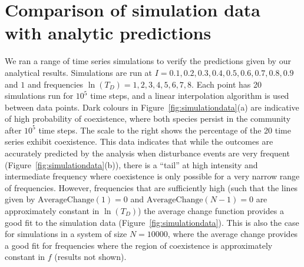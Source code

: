 \section{Comparison of simulation data with analytic predictions}
\label{app2d}
We ran a range of time series simulations to verify the predictions given by our analytical results. Simulations are run at $I=0.1,0.2,0.3,0.4,0.5,0.6,0.7,0.8,0.9$ and $1$ and frequencies $\ln(T_D)=1,2,3,4,5,6,7,8$. Each point has 20 simulations run for $10^5$ time steps, and a linear interpolation algorithm is used between data points. Dark colours in Figure~\ref{fig:simulationdata}(a) are indicative of high probability of coexistence, where both species persist in the community after $10^5$ time steps. The scale to the right shows the percentage of the 20 time series exhibit coexistence. This data indicates that while the outcomes are accurately predicted by the analysis when disturbance events are very frequent (Figure~\ref{fig:simulationdata}(b)), there is a ``tail'' at high intensity and intermediate frequency where coexistence is only possible for a very narrow range of frequencies. However, frequencies that are sufficiently high (such that the lines given by $\text{AverageChange}(1)=0$ and $\text{AverageChange}(N-1)=0$  are approximately constant in $\ln(T_D)$) the average change function provides a good fit to the simulation data (Figure~\ref{fig:simulationdata}). This is also the case for simulations in a system of size $N=10000$, where the average change provides a good fit for frequencies where the region of coexistence is approximately constant in $f$ (results not shown).

